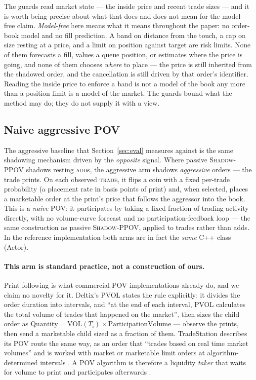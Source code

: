 \documentclass[11pt]{article}
\newcommand{\pov}{\textsc{Shadow-PPOV}}
\begin{document}
The guards read market state --- the inside price and recent trade sizes --- and
it is worth being precise about what that does and does not mean for the
model-free claim. \emph{Model-free} here means what it means throughout the
paper: no order-book model and no fill prediction. A band on distance from the
touch, a cap on size resting at a price, and a limit on position against target
are risk limits. None of them forecasts a fill, values a queue position, or
estimates where the price is going, and none of them chooses \emph{where} to
place --- the price is still inherited from the shadowed order, and the
cancellation is still driven by that order's identifier. Reading the inside
price to enforce a band is not a model of the book any more than a position
limit is a model of the market. The guards bound what the method may do; they
do not supply it with a view.

\subsection{Naive aggressive POV}
\label{sec:aggressive}

The aggressive baseline that Section~\ref{sec:eval} measures against is the same
shadowing mechanism driven by the \emph{opposite} signal. Where passive \pov{}
shadows resting \textsc{add}s, the aggressive arm shadows \emph{aggressive}
orders --- the trade prints. On each observed \textsc{trade}, it flips a
coin with a fixed per-trade probability (a placement rate in basis points of
print) and, when selected, places a marketable order
at the print's price that follows the aggressor into the book. This is a
\emph{naive} POV: it participates by taking a fixed fraction of trading activity
directly, with no volume-curve forecast and no participation-feedback loop ---
the same construction as passive \pov{}, applied to trades rather than adds.
In the reference implementation both arms are in fact the \emph{same} C++ class (Actor).

\paragraph{This arm is standard practice, not a construction of ours.} Print
following is what commercial POV implementations already do, and we claim no
novelty for it. Deltix's PVOL states the rule explicitly: it divides the order
duration into intervals, and ``at the end of each interval, PVOL calculates the
total volume of trades that happened on the market'', then sizes the child order
as $\text{Quantity} = \text{VOL}(T_i) \times \text{ParticipationVolume}$
\cite{deltixpvol} --- observe the prints, then send a marketable child sized as a
fraction of them. TradeStation describes its POV route the same way, as an order
that ``trades based on real time market volumes'' and is worked with market or
marketable limit orders at algorithm-determined intervals \cite{tspov}. A POV
algorithm is therefore a liquidity \emph{taker} that waits for volume to print
and participates afterwards \cite{kissell}.
\end{document}
